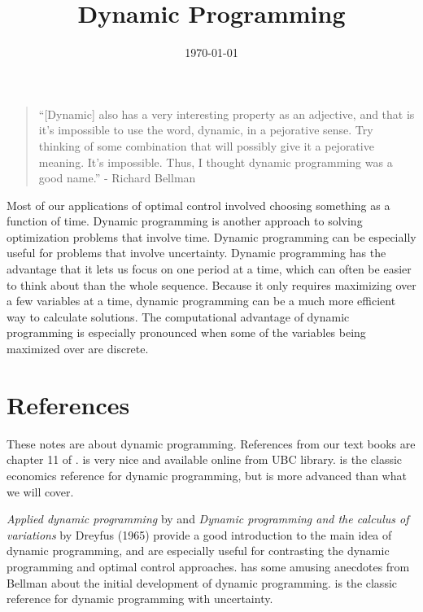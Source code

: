  

\title{Dynamic Programming}
\date{\today}



\maketitle

\begin{quotation}
  ``[Dynamic] also has a very interesting property as an adjective, and
  that is it’s impossible to use the word, dynamic, in a pejorative
  sense. Try thinking of some combination that will possibly give it a
  pejorative meaning.  It’s impossible. Thus, I thought dynamic
  programming was a good name.'' - Richard Bellman
\end{quotation}

Most of our applications of optimal control involved choosing
something as a function of time. Dynamic programming is another
approach to solving optimization problems that involve time. Dynamic
programming can be especially useful for problems that involve
uncertainty. Dynamic programming has the advantage
that it lets us focus on one period at a time, which can often be
easier to think about than the whole sequence. Because it only
requires maximizing over a few variables at a time, dynamic
programming can be a much more efficient way to calculate
solutions. The computational advantage of dynamic programming is
especially pronounced when some of the variables being maximized over
are discrete.

\section{References}

These notes are about dynamic programming.  References from our text
books are chapter 11 of \cite{dixit1990}. \cite{adda2003} is very nice
and available online from UBC library.  \cite{stokey1989} is the
classic economics reference for dynamic programming, but is more
advanced than what we will cover. 

\textit{Applied dynamic programming} by \cite{bellman1962} and
\textit{Dynamic programming and the calculus of variations} by Dreyfus
(1965) provide a good introduction to the main idea of dynamic
programming, and are especially useful for contrasting the dynamic
programming and optimal control approaches.  \cite{dreyfus2002} has
some amusing anecdotes from Bellman about the initial development of
dynamic programming.  \cite{bertsekas1976} is
the classic reference for dynamic programming with uncertainty.

